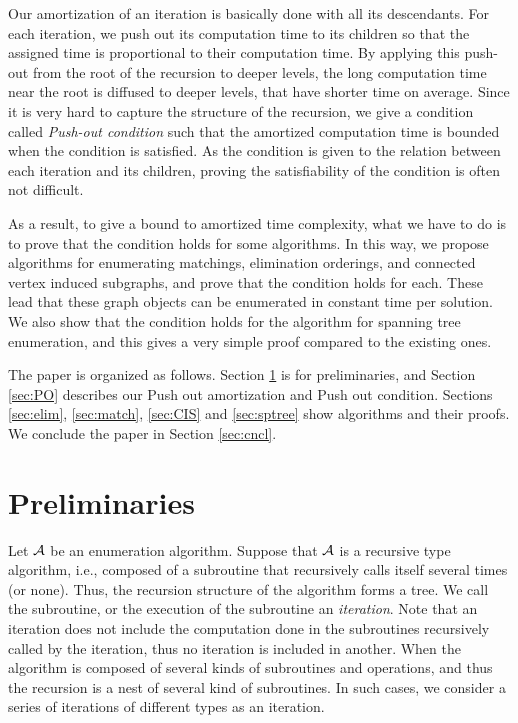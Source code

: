 \documentclass{llncs}
\begin{document}
Our amortization of an iteration is basically done with all its descendants.
For each iteration, we push out its computation time to its children 
 so that the assigned time is proportional to their computation time.
By applying this push-out from the root of the recursion to deeper levels,
 the long computation time near the root is diffused to deeper levels,
 that have shorter time on average.
Since it is very hard to capture the structure of the recursion, we give a
 condition called {\em Push-out condition} such that the amortized
 computation time is bounded when the condition is satisfied.
As the condition is given to the relation between each iteration and its
 children, proving the satisfiability of the condition is often not difficult.

As a result, to give a bound to amortized time complexity, what we have
 to do is to prove that the condition holds for some algorithms.
In this way, we propose algorithms for enumerating matchings,
 elimination orderings, and connected vertex induced subgraphs, and 
 prove that the condition holds for each.
These lead that these graph objects can be enumerated in constant time per
 solution.
We also show that the condition holds for the algorithm for spanning tree
 enumeration, and this gives a very simple proof compared to the existing
 ones.

The paper is organized as follows.
Section \ref{sec:prlm} is for preliminaries, and Section \ref{sec:PO} describes
 our Push out amortization and Push out condition.
Sections \ref{sec:elim}, \ref{sec:match}, \ref{sec:CIS} and \ref{sec:sptree}
 show algorithms and their proofs.
We conclude the paper in Section \ref{sec:cncl}.


\vspace{-2mm}
\section{Preliminaries}\label{sec:prlm}
\vspace{-2mm}

Let $\cal A$ be an enumeration algorithm.
Suppose that $\cal A$ is a recursive type algorithm, i.e., composed of 
 a subroutine that recursively calls itself several times (or none).
Thus, the recursion structure of the algorithm forms a tree.
We call the subroutine, or the execution of the subroutine an
 {\em iteration}.
Note that an iteration does not include the computation done in the 
 subroutines recursively called by the iteration, thus no iteration is
 included in another.
When the algorithm is composed of several kinds of subroutines and
 operations, and thus the recursion is a nest of several kind of subroutines.
In such cases, we consider a series of iterations of different types as 
 an iteration.
\end{document}
